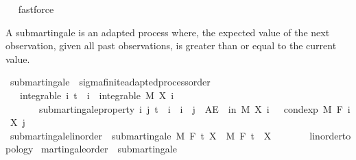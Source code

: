 \begin{isabellebody}
\isadelimproof
\ %
\endisadelimproof
%
\isatagproof
{}\isamarkupfalse%
\ fastforce%
\endisatagproof
{\isafoldproof}%
%
\isadelimproof
%
\endisadelimproof
%
\isadelimdocument
%
\endisadelimdocument
%
\isatagdocument
%
\isamarkuptrue%
%
\endisatagdocument
{\isafolddocument}%
%
\isadelimdocument
%
\endisadelimdocument
%
\begin{isamarkuptext}%
A submartingale is an adapted process where, the expected value of the next observation, given all past observations, is greater than or equal to the current value.%
\end{isamarkuptext}\isamarkuptrue%
\isamarkupfalse%
\ submartingale\ {\isacharequal}{\kern0pt}\ sigma{\isacharunderscore}{\kern0pt}finite{\isacharunderscore}{\kern0pt}adapted{\isacharunderscore}{\kern0pt}process{\isacharunderscore}{\kern0pt}order\ {\isacharplus}{\kern0pt}\isanewline
\ \ \ integrable{\isacharcolon}{\kern0pt}\ {\isachardoublequoteopen}{\isasymAnd}i{\isachardot}{\kern0pt}\ t\ {\isasymle}\ i\ {\isasymLongrightarrow}\ integrable\ M\ {\isacharparenleft}{\kern0pt}X\ i{\isacharparenright}{\kern0pt}{\isachardoublequoteclose}\isanewline
\ \ \ \ \ \ \ submartingale{\isacharunderscore}{\kern0pt}property{\isacharcolon}{\kern0pt}\ {\isachardoublequoteopen}{\isasymAnd}i\ j{\isachardot}{\kern0pt}\ t\ {\isasymle}\ i\ {\isasymLongrightarrow}\ i\ {\isasymle}\ j\ {\isasymLongrightarrow}\ AE\ {\isasymxi}\ in\ M{\isachardot}{\kern0pt}\ X\ i\ {\isasymxi}\ {\isasymle}\ cond{\isacharunderscore}{\kern0pt}exp\ M\ {\isacharparenleft}{\kern0pt}F\ i{\isacharparenright}{\kern0pt}\ {\isacharparenleft}{\kern0pt}X\ j{\isacharparenright}{\kern0pt}\ {\isasymxi}{\isachardoublequoteclose}\isanewline
\isanewline
{}\isamarkupfalse%
\ submartingale{\isacharunderscore}{\kern0pt}linorder\ {\isacharequal}{\kern0pt}\ submartingale\ M\ F\ t\ X\ \ M\ F\ t\ \ X\ {\isacharcolon}{\kern0pt}{\isacharcolon}{\kern0pt}\ {\isachardoublequoteopen}{\isacharunderscore}{\kern0pt}\ {\isasymRightarrow}\ {\isacharunderscore}{\kern0pt}\ {\isasymRightarrow}\ {\isacharunderscore}{\kern0pt}\ {\isacharcolon}{\kern0pt}{\isacharcolon}{\kern0pt}\ {\isacharbraceleft}{\kern0pt}linorder{\isacharunderscore}{\kern0pt}topology{\isacharbraceright}{\kern0pt}{\isachardoublequoteclose}\isanewline
\isanewline
{}\isamarkupfalse%
\ martingale{\isacharunderscore}{\kern0pt}order\ {\isasymsubseteq}\ submartingale%

\end{isabellebody}
